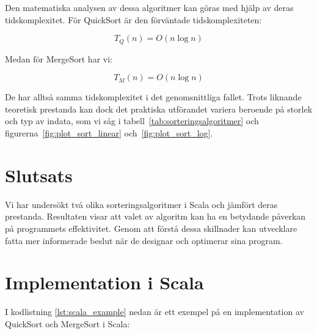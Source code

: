 \documentclass[a4paper,12pt]{article}   %
\begin{document}
Den matematiska analysen av dessa algoritmer kan göras med hjälp av deras tidskomplexitet. För QuickSort är den förväntade tidskomplexiteten:

\[
    T_Q(n) = O(n \log n)
\]

Medan för MergeSort har vi:

\[
    T_M(n) = O(n \log n)
\]

De har alltså samma tidskomplexitet i det genomsnittliga fallet.
Trots liknande teoretisk prestanda kan dock det praktiska utförandet variera beroende på storlek och typ av indata, som vi såg i tabell~\ref{tab:sorteringsalgoritmer} och figurerna~\ref{fig:plot_sort_linear} och~\ref{fig:plot_sort_log}.

\section{Slutsats}

Vi har undersökt två olika sorteringsalgoritmer i Scala och jämfört deras prestanda. Resultaten visar att valet av algoritm kan ha en betydande påverkan på programmets effektivitet. Genom att förstå dessa skillnader kan utvecklare fatta mer informerade beslut när de designar och optimerar sina program.

\newpage

\appendix
\section{Implementation i Scala}
\label{app:scala_impl}

I kodlistning \ref{lst:scala_example} nedan är ett exempel på en implementation av QuickSort och MergeSort i Scala:


\end{document}

